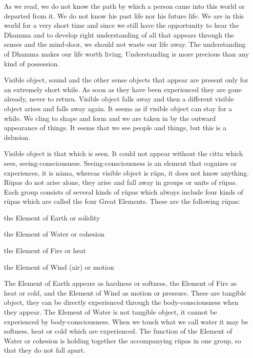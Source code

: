 As we read, we do not know the path by which a person came into this
world or departed from it. We do not know his past life nor his future
life. We are in this world for a very short time and since we still have
the opportunity to hear the Dhamma and to develop right understanding of
all that appears through the senses and the mind-door, we should not
waste our life away. The understanding of Dhamma makes our life worth
living. Understanding is more precious than any kind of possession.

Visible object, sound and the other sense objects that appear are
present only for an extremely short while. As soon as they have been
experienced they are gone already, never to return. Visible object falls
away and then a different visible object arises and falls away again. It
seems as if visible object can stay for a while. We cling to shape and
form and we are taken in by the outward appearance of things. It seems
that we see people and things, but this is a delusion.

Visible object is that which is seen. It could not appear without the
citta which sees, seeing-consciousness. Seeing-consciousness is an
element that cognizes or experiences, it is nāma, whereas visible object
is rūpa, it does not know anything. Rūpas do not arise alone, they arise
and fall away in groups or units of rūpas. Each group consists of
several kinds of rūpas which always include four kinds of rūpas which
are called the four Great Elements. These are the following rūpas:

\begin{description}

\item the Element of Earth or solidity
\item the Element of Water or cohesion
\item the Element of Fire or heat
\item the Element of Wind (air) or motion

\end{description}

The Element of Earth appears as hardness or softness, the Element of
Fire as heat or cold, and the Element of Wind as motion or pressure.
These are tangible object, they can be directly experienced through the
body-consciousness when they appear. The Element of Water is not
tangible object, it cannot be experienced by body-consciousness. When we
touch what we call water it may be softness, heat or cold which are
experienced. The function of the Element of Water or cohesion is holding
together the accompanying rūpas in one group, so that they do not fall
apart.

